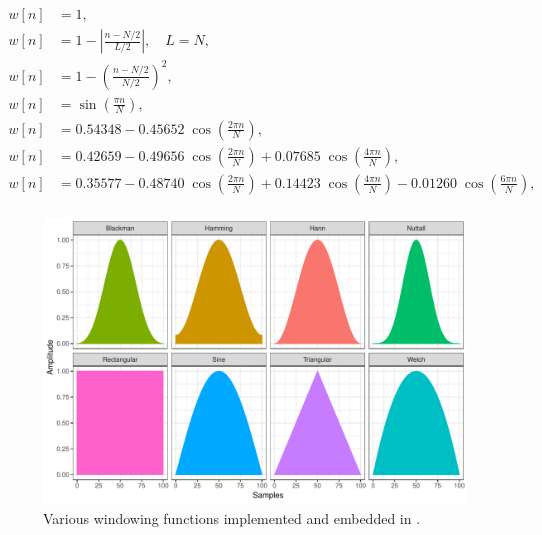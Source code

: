 \begin{align}
  w[n] & = 1,
  \tag*{(rectangular)}                                                                                                                                        \\
  w[n] & = 1-\left|\tfrac {n-N/2}{L/2}\right|, \quad L=N,
  \tag*{(triangular/Bartlett)}                                                                                                                                \\
  w[n] & = 1-\left(\tfrac {n-N/2}{N/2}\right)^{2},
  \tag*{(Welch)}                                                                                                                                              \\
  w[n] & = \sin \left(\tfrac {\pi n}{N}\right),
  \tag*{(sine)}                                                                                                                                               \\
  w[n] & = 0.54348-0.45652\;\cos \left(\tfrac {2\pi n}{N}\right),
  \tag*{(Hamming)}                                                                                                                                            \\
  w[n] & = 0.42659-0.49656\;\cos \left(\tfrac {2\pi n}{N}\right)+0.07685\;\cos \left(\tfrac {4\pi n}{N}\right),
  \tag*{(Blackman)}                                                                                                                                           \\
  w[n] & = 0.35577-0.48740\;\cos \left(\tfrac {2\pi n}{N}\right)+0.14423\;\cos \left(\tfrac {4\pi n}{N}\right)-0.01260\;\cos \left(\tfrac {6\pi n}{N}\right),
  \tag*{(Nuttall)}                                                                                                                                            \\
  \label{eq.filter}
\end{align}
\begin{figure}[!h]
  \centering
  \includegraphics[width=\linewidth]{filters.pdf}
  \caption{Various windowing functions implemented and embedded in \smashpp.}
  \label{fig.filters}
\end{figure}

